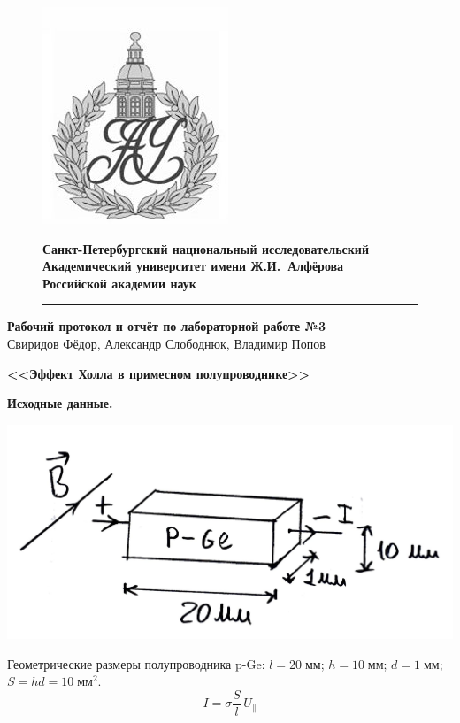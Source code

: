 \documentclass[a4paper]{article}
\begin{document}
	\begin{figure}[htb]
		\begin{minipage}[c]{0.12\textwidth}
			\includegraphics[scale=0.25]{AU}
		\end{minipage}
		\hfill
		\begin{minipage}[t]{0.9\textwidth}
			{\Large\bfseries Санкт-Петербургский национальный исследовательский Академический университет имени Ж.И.~Алфёрова\\Российской академии наук}
		\end{minipage}
		\rule{164mm}{0.3mm}
	\end{figure}
	
	\begin{center}
		{\large\textbf{Рабочий протокол и отчёт по лабораторной работе №3 }}\\
		Свиридов Фёдор, Александр Слободнюк, Владимир Попов
	\end{center}
	\begin{center}
		\Large\bfseries{<<Эффект Холла в примесном полупроводнике>>}\\
	\end{center}
	
	{\parindent=0pt\textbf{Исходные данные.}}\\
	\begin{center}
		\includegraphics[scale=0.3]{pain}
	\end{center}
Геометрические размеры полупроводника p-Ge:
$l=20\;\mbox{мм}$; $h=10\;\mbox{мм}$; $d=1\;\mbox{мм}$; $S=hd=10\;\mbox{мм}^2$.
\begin{equation}
	I=\sigma\frac{S}{l}\,U_{\parallel}
\end{equation}
\end{document}
